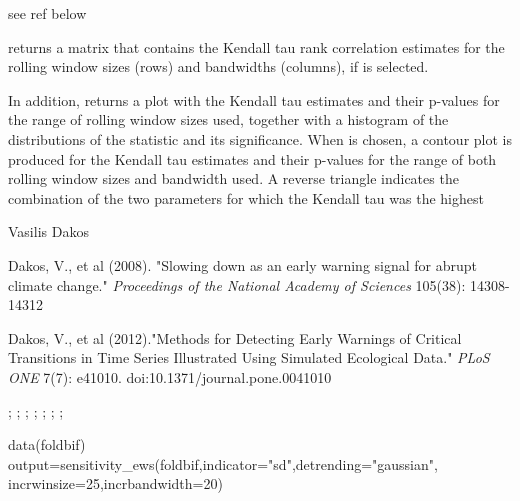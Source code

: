 \documentclass[a4paper]{book}
\begin{document}
%
\begin{Details}\relax
see ref below
\end{Details}
%
\begin{Value}
 returns a matrix that contains the
Kendall tau rank correlation estimates for the rolling
window sizes (rows) and bandwidths (columns), if
 is selected.

In addition,  returns a plot with
the Kendall tau estimates and their p-values for the
range of rolling window sizes used, together with a
histogram of the distributions of the statistic and its
significance. When  is chosen, a
contour plot is produced for the Kendall tau estimates
and their p-values for the range of both rolling window
sizes and bandwidth used. A reverse triangle indicates
the combination of the two parameters for which the
Kendall tau was the highest
\end{Value}
%
\begin{Author}\relax
Vasilis Dakos 
\end{Author}
%
\begin{References}\relax
Dakos, V., et al (2008). "Slowing down as an early
warning signal for abrupt climate change."
\emph{Proceedings of the National Academy of Sciences}
105(38): 14308-14312

Dakos, V., et al (2012)."Methods for Detecting Early
Warnings of Critical Transitions in Time Series
Illustrated Using Simulated Ecological Data." \emph{PLoS
ONE} 7(7): e41010. doi:10.1371/journal.pone.0041010
\end{References}
%
\begin{SeeAlso}\relax
{}; ;
; ;
; ;
;
\end{SeeAlso}
%
\begin{Examples}
\begin{ExampleCode}
data(foldbif)
output=sensitivity_ews(foldbif,indicator="sd",detrending="gaussian",
incrwinsize=25,incrbandwidth=20)
\end{ExampleCode}
\end{Examples}
\end{document}
